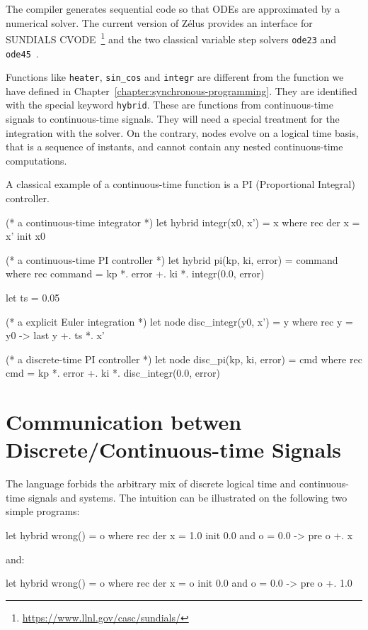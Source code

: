 \documentclass[11pt,titlepage,twoside]{report}
\newcommand{\zelus}{{\sf Z\'elus}}
\newcommand{\Remark}{\medskip\noindent{\bf Remark: }}
\begin{document}
\Remark The compiler generates sequential code so that \acp{ODE} are
approximated by a numerical solver. The current version of \zelus{}
provides an interface for SUNDIALS
CVODE~\cite{sundials:2005}\footnote{\url{https://www.llnl.gov/casc/sundials/}}
and the two classical variable step solvers \texttt{ode23} and
\texttt{ode45}~\cite{DahlquistBjo08}.

\medskip Functions like \verb+heater+, \verb+sin_cos+ and
\verb+integr+ are different from the function we have defined in
Chapter~\ref{chapter:synchronous-programming}. They are identified
with the special keyword \texttt{hybrid}. These are functions from
continuous-time signals to continuous-time signals. They will need a
special treatment for the integration with the solver. On the
contrary, nodes evolve on a logical time basis, that is a sequence of
instants, and cannot contain any nested continuous-time computations.

A classical example of a continuous-time function is a PI
(Proportional Integral) controller.

\begin{runverbatim}[withresult]
(* a continuous-time integrator *)
let hybrid integr(x0, x') = x where
  rec der x = x' init x0

(* a continuous-time PI controller *)
let hybrid pi(kp, ki, error) = command where
  rec command = kp *. error +. ki *. integr(0.0, error) 

let ts = 0.05

(* a explicit Euler integration *)
let node disc_integr(y0, x') = y where
  rec y = y0 -> last y +. ts *. x'

(* a discrete-time PI controller *)
let node disc_pi(kp, ki, error) = cmd where
  rec cmd = kp *. error +. ki *. disc_integr(0.0, error)
\end{runverbatim}

\section{Communication betwen Discrete/Continuous-time Signals}
The language forbids the arbitrary mix of discrete logical time and
continuous-time signals and systems. The intuition can be illustrated
on the following two simple programs:

\begin{runverbatim}[fail]
let hybrid wrong() = o where
  rec der x = 1.0 init 0.0
  and o = 0.0 -> pre o +. x
\end{runverbatim}
and:
\begin{runverbatim}[fail]
let hybrid wrong() = o where
  rec der x = o init 0.0
  and o = 0.0 -> pre o +. 1.0
\end{runverbatim}
\end{document}
